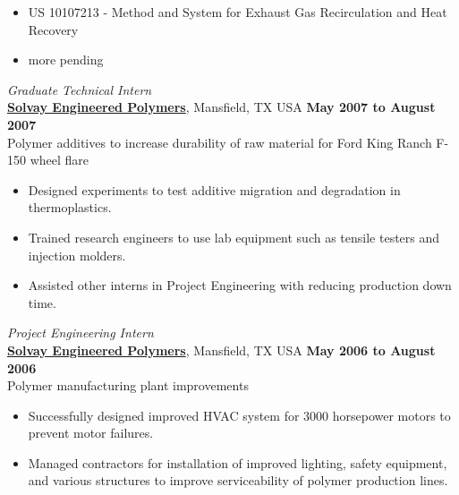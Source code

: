 \documentclass[centered]{res}
\begin{document}
\begin{resume}
\begin{itemize}
\item US 10107213 - Method and System for Exhaust Gas Recirculation and Heat Recovery
\item more pending
\end{itemize} \vspace{-8pt}
%
\textit{Graduate Technical Intern} \\
\href{http://www.lyondellbasell.com/LandingPages/SolvayEngineeredPolymers}{\textbf{Solvay
    Engineered Polymers}}, Mansfield, TX USA 
\hfill \textbf{May 2007 to August 2007} \\
Polymer additives to increase durability of raw material for Ford King
Ranch F-150 wheel flare
\begin{itemize} \itemsep -2pt %
\item Designed experiments to test additive migration
  and degradation in thermoplastics.
\item Trained research engineers to use lab equipment such as tensile
  testers and injection molders.
\item Assisted other interns in Project Engineering with
  reducing production down time.
\end{itemize} \vspace{-8pt}
%
\textit{Project Engineering Intern} \\
\href{http://www.lyondellbasell.com/LandingPages/SolvayEngineeredPolymers}{\textbf{Solvay
    Engineered Polymers}}, Mansfield, TX USA 
\hfill \textbf{May 2006 to August 2006} \\
Polymer manufacturing plant improvements 
\begin{itemize} \itemsep -2pt %
\item Successfully designed improved HVAC system for 3000 horsepower
  motors to prevent motor failures.
\item Managed contractors for installation of improved lighting,
  safety equipment, and various structures to improve serviceability
  of polymer production lines.
\end{itemize} 
%

\end{resume}
\end{document}

